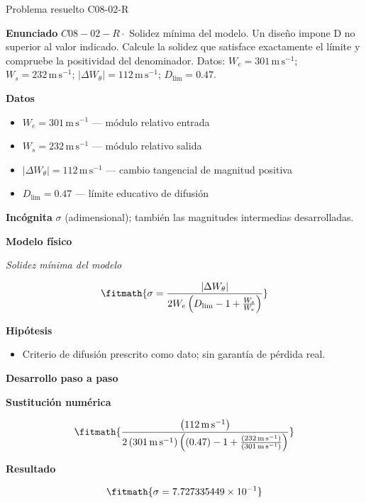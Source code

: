 \documentclass[10pt,openany]{book}
\begin{document}
\begin{studiumworked}{Problema resuelto C08-02-R}


\noindent\textbf{Enunciado}
\(C08-02-R \cdot\) Solidez mínima del modelo. Un diseño impone D no superior al valor indicado. Calcule la solidez que satisface exactamente el límite y compruebe la positividad del denominador. Datos: \(W_e=301\, \mathrm{m}\,\mathrm{s}^{-1}\); \(W_s=232\, \mathrm{m}\,\mathrm{s}^{-1}\); \(|\Delta W_\theta|=112\, \mathrm{m}\,\mathrm{s}^{-1}\); \(D_{\mathrm{lim}}=0.47\).

\noindent\textbf{Datos}
\begin{itemize}
\item $W_e = 301\,\mathrm{m}\,\mathrm{s}^{-1}$ — módulo relativo entrada
\item $W_s = 232\,\mathrm{m}\,\mathrm{s}^{-1}$ — módulo relativo salida
\item $|\Delta W_\theta| = 112\,\mathrm{m}\,\mathrm{s}^{-1}$ — cambio tangencial de magnitud positiva
\item $D_{\mathrm{lim}} = 0.47$ — límite educativo de difusión
\end{itemize}

\noindent\textbf{Incógnita}
$\sigma$ (adimensional); también las magnitudes intermedias desarrolladas.

\noindent\textbf{Modelo físico}

\noindent\textit{Solidez mínima del modelo}

\[
\fitmath{\sigma=\frac{|\Delta W_\theta|}{2 W_e \left(D_{\mathrm{lim}} - 1 + \frac{W_s}{W_e}\right)}}
\]

\noindent\textbf{Hipótesis}
\begin{itemize}
\item Criterio de difusión prescrito como dato; sin garantía de pérdida real.
\end{itemize}

\noindent\textbf{Desarrollo paso a paso}



\noindent\textbf{Sustitución numérica}

\[
\fitmath{\frac{\left(112\,\mathrm{m}\,\mathrm{s}^{-1}\right)}{2 \left(301\,\mathrm{m}\,\mathrm{s}^{-1}\right) \left(\left(0.47\right) - 1 + \frac{\left(232\,\mathrm{m}\,\mathrm{s}^{-1}\right)}{\left(301\,\mathrm{m}\,\mathrm{s}^{-1}\right)}\right)}}
\]

\noindent\textbf{Resultado}

\[
\fitmath{\sigma=7.727335449\times10^{-1}}
\]


\end{studiumworked}
\end{document}
